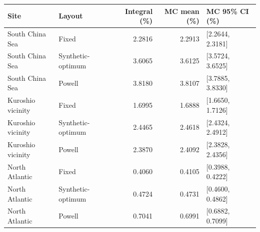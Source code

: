 \begin{tabular}{llrrl}
\toprule
Site & Layout & Integral (\%) & MC mean (\%) & MC 95\% CI (\%) \\
\midrule
South China Sea & Fixed & 2.2816 & 2.2913 & [2.2644, 2.3181] \\
South China Sea & Synthetic-optimum & 3.6065 & 3.6125 & [3.5724, 3.6525] \\
South China Sea & Powell & 3.8180 & 3.8107 & [3.7885, 3.8330] \\
Kuroshio vicinity & Fixed & 1.6995 & 1.6888 & [1.6650, 1.7126] \\
Kuroshio vicinity & Synthetic-optimum & 2.4465 & 2.4618 & [2.4324, 2.4912] \\
Kuroshio vicinity & Powell & 2.3870 & 2.4092 & [2.3828, 2.4356] \\
North Atlantic & Fixed & 0.4060 & 0.4105 & [0.3988, 0.4222] \\
North Atlantic & Synthetic-optimum & 0.4724 & 0.4731 & [0.4600, 0.4862] \\
North Atlantic & Powell & 0.7041 & 0.6991 & [0.6882, 0.7099] \\
\bottomrule
\end{tabular}
